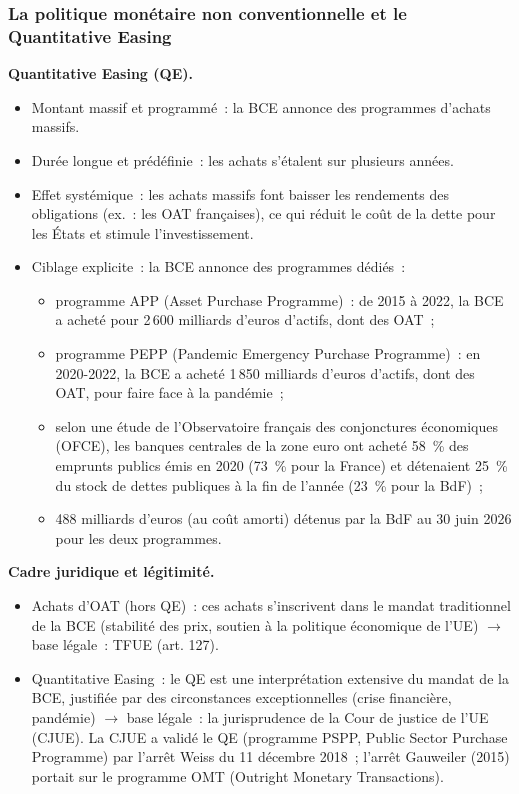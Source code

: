 \subsubsection{La politique monétaire non conventionnelle et le Quantitative Easing}

\textbf{Quantitative Easing (QE).}
\begin{itemize}
  \item Montant massif et programmé~: la BCE annonce des programmes d'achats massifs.
  \item Durée longue et prédéfinie~: les achats s'étalent sur plusieurs années.
  \item Effet systémique~: les achats massifs font baisser les rendements des
    obligations (ex.~: les OAT françaises), ce qui réduit le coût de la dette pour les
    États et stimule l'investissement.
  \item Ciblage explicite~: la BCE annonce des programmes dédiés~:
    \begin{itemize}
      \item programme APP (Asset Purchase Programme)~: de 2015 à 2022, la BCE a acheté
        pour 2\,600 milliards d'euros d'actifs, dont des OAT~;
      \item programme PEPP (Pandemic Emergency Purchase Programme)~: en 2020-2022, la
        BCE a acheté 1\,850 milliards d'euros d'actifs, dont des OAT, pour faire face à
        la pandémie~;
      \item selon une étude de l'Observatoire français des conjonctures économiques
        (OFCE), les banques centrales de la zone euro ont acheté 58~\% des emprunts
        publics émis en 2020 (73~\% pour la France) et détenaient 25~\% du stock de
        dettes publiques à la fin de l'année (23~\% pour la BdF)~;
      \item 488 milliards d'euros (au coût amorti) détenus par la BdF au 30 juin 2026
        pour les deux programmes.
    \end{itemize}
\end{itemize}

\textbf{Cadre juridique et légitimité.}
\begin{itemize}
  \item Achats d'OAT (hors QE)~: ces achats s'inscrivent dans le mandat traditionnel de
    la BCE (stabilité des prix, soutien à la politique économique de l'UE) $\to$ base
    légale~: TFUE (art. 127).
  \item Quantitative Easing~: le QE est une interprétation extensive du mandat de la
    BCE, justifiée par des circonstances exceptionnelles (crise financière, pandémie)
    $\to$ base légale~: la jurisprudence de la Cour de justice de l'UE (CJUE). La CJUE
    a validé le QE (programme PSPP, Public Sector Purchase Programme) par l'arrêt Weiss du 11 décembre 2018~; l'arrêt
    Gauweiler (2015) portait sur le programme OMT (Outright Monetary Transactions).
\end{itemize}

